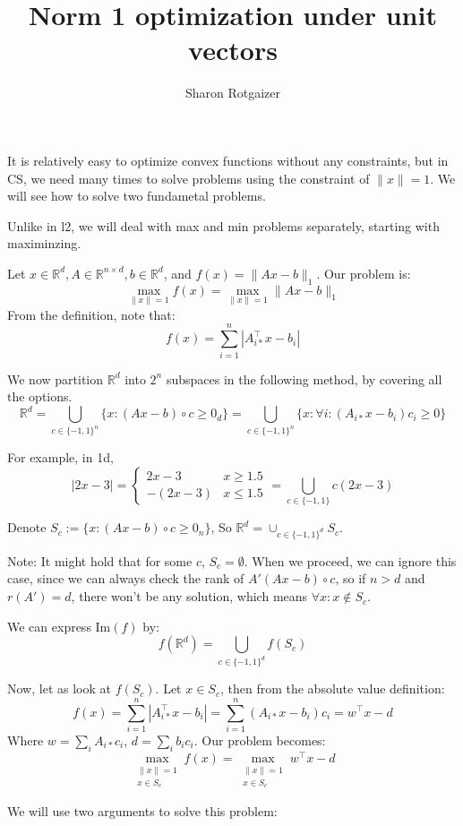 \documentclass[12pt, a4paper]{article}
\title{Norm 1 optimization under unit vectors}
\newcommand{\norm}[1]{\lVert #1 \rVert}
\newcommand{\double}[1]{\mathbb{#1}}
\begin{document}
\author{Sharon Rotgaizer}
\maketitle


It is relatively easy to optimize convex functions without any constraints, but in CS, we need many times to solve problems using the constraint of $\norm{x}=1$. We will see how to solve two fundametal problems.


Unlike in l2, we will deal with max and min problems separately, starting with maximinzing.

Let $x\in\double{R}^d, A\in\double{R}^{n\times d}, b\in\double{R}^d$, and $f(x)=\norm{Ax-b}_1$. Our problem is:
\[\max_{\norm{x}=1} f(x)=\max_{\norm{x}=1} \norm{Ax-b}_1\]
From the definition, note that:
\[f(x)=\sum_{i=1}^n |A_{i*}^\top x-b_i|\]

We now partition $\double{R}^d$ into $2^n$ subspaces in the following method, by covering all the options.
\[\double{R}^d=\bigcup_{c\in\{-1,1\}^n} \{x: (Ax-b)\circ c\geq 0_d\}= \bigcup_{c\in\{-1,1\}^n} \{x: \forall i: (A_{i*}x-b_i)c_i \geq 0\}\]

For example, in 1d,
\[|2x-3|=\begin{cases}
    2x-3 & x\geq 1.5 \\
    -(2x-3) & x\leq 1.5
\end{cases}=\bigcup_{c\in\{-1,1\}} c(2x-3)\]

Denote $S_c:=\{x: (Ax-b)\circ c\geq 0_n\}$, So $\double{R}^d=\cup_{c\in\{-1,1\}^d} S_c$. 

Note: It might hold that for some $c$, $S_c=\emptyset$. When we proceed, we can ignore this case, since we can always check the rank of $A'(Ax-b)\circ c$, so if $n>d$ and $r(A')=d$, there won't be any solution, which means $\forall x: x\notin S_c$. 

We can express $\text{Im}(f)$ by:
\[f(\double{R}^d)=\bigcup_{c\in\{-1,1\}^d} f(S_c)\]

Now, let as look at $f(S_c)$. Let $x\in S_c$, then from the absolute value definition:
\[f(x)=\sum_{i=1}^n |A_{i*}^\top x-b_i|=\sum_{i=1}^n (A_{i*}x-b_i)c_i=w^\top x-d\]
Where $w=\sum_i A_{i*}c_i$, $d=\sum_i b_ic_i$. Our problem becomes:
\[\max_{
\substack{\norm{x}=1 \\ 
x\in S_c}} f(x)=\max_{
\substack{\norm{x}=1 \\ 
x\in S_c}} w^\top x-d\]

\newpage

We will use two arguments to solve this problem: 
\end{document}
